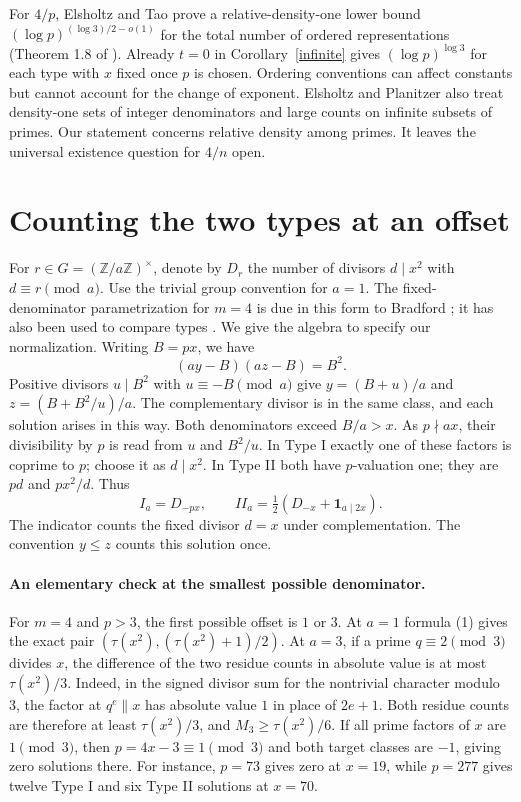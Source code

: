 \documentclass[11pt]{article}
\begin{document}
For $4/p$, Elsholtz and Tao prove a relative-density-one lower bound $(\log p)^{(\log 3)/2-o(1)}$ for the total number of ordered representations (Theorem 1.8 of \cite{ET}). Already $t=0$ in Corollary~\ref{infinite} gives $(\log p)^{\log 3}$ for each type with $x$ fixed once $p$ is chosen. Ordering conventions can affect constants but cannot account for the change of exponent. Elsholtz and Planitzer \cite{EP} also treat density-one sets of integer denominators and large counts on infinite subsets of primes. Our statement concerns relative density among primes. It leaves the universal existence question for $4/n$ open.

\section{Counting the two types at an offset}
For $r\in G=(\mathbb Z/a\mathbb Z)^\times$, denote by $D_r$ the number of divisors $d\mid x^2$ with $d\equiv r\pmod a$. Use the trivial group convention for $a=1$. The fixed-denominator parametrization for $m=4$ is due in this form to Bradford \cite{Bradford}; it has also been used to compare types \cite{Jiang}. We give the algebra to specify our normalization. Writing $B=px$, we have
\[
 (ay-B)(az-B)=B^2.
\]
Positive divisors $u\mid B^2$ with $u\equiv-B\pmod a$ give $y=(B+u)/a$ and $z=(B+B^2/u)/a$. The complementary divisor is in the same class, and each solution arises in this way. Both denominators exceed $B/a>x$. As $p\nmid ax$, their divisibility by $p$ is read from $u$ and $B^2/u$. In Type I exactly one of these factors is coprime to $p$; choose it as $d\mid x^2$. In Type II both have $p$-valuation one; they are $pd$ and $p x^2/d$. Thus
\[
 I_a=D_{-px},\qquad
 II_a=\tfrac12\left(D_{-x}+\mathbf 1_{a\mid 2x}\right).
 \tag{1}
\]
The indicator counts the fixed divisor $d=x$ under complementation. The convention $y\le z$ counts this solution once.

\paragraph{An elementary check at the smallest possible denominator.}
For $m=4$ and $p>3$, the first possible offset is $1$ or $3$. At $a=1$ formula (1) gives the exact pair $(\tau(x^2),(\tau(x^2)+1)/2)$. At $a=3$, if a prime $q\equiv2\pmod3$ divides $x$, the difference of the two residue counts in absolute value is at most $\tau(x^2)/3$. Indeed, in the signed divisor sum for the nontrivial character modulo 3, the factor at $q^e\parallel x$ has absolute value $1$ in place of $2e+1$. Both residue counts are therefore at least $\tau(x^2)/3$, and $M_3\ge\tau(x^2)/6$. If all prime factors of $x$ are $1\pmod3$, then $p=4x-3\equiv1\pmod3$ and both target classes are $-1$, giving zero solutions there. For instance, $p=73$ gives zero at $x=19$, while $p=277$ gives twelve Type I and six Type II solutions at $x=70$.
\end{document}
